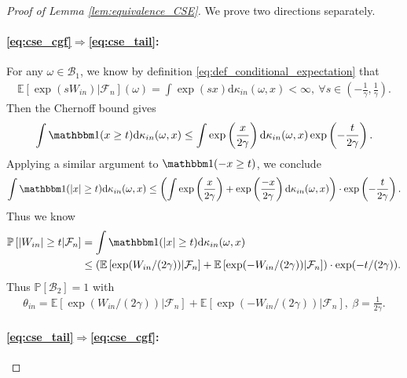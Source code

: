 \documentclass[12pt]{article}
\theoremstyle{definition}
\def\P{\mathbb{P}}
\def\P{\mathbb{P}}
\newcommand{\E}{\mathbb E}								%
\renewcommand{\P}{\mathbb{P}}							%
\newcommand{\indicator}{\mathbbm 1}						%
\begin{document}
\begin{proof}[Proof of Lemma \ref{lem:equivalence_CSE}]
	We prove two directions separately. 
	\paragraph{\eqref{eq:cse_cgf}$\Rightarrow $\eqref{eq:cse_tail}:}
	For any $\omega\in \mathcal{B}_1$, we know by definition \eqref{eq:def_conditional_expectation} that
	\begin{align*}
		\E[\exp(sW_{in})|\mathcal{F}_n](\omega)=\int \exp(sx)\mathrm{d}\kappa_{in}(\omega,x)<\infty,\ \forall s\in \left(-\frac{1}{\gamma},\frac{1}{\gamma}\right).
	\end{align*}
	Then the Chernoff bound gives 
	\begin{align*}
		\int \indicator(x\geq t)\mathrm{d}\kappa_{in}(\omega,x)\leq \int \exp\left(\frac{x}{2\gamma}\right)\mathrm{d}\kappa_{in}(\omega,x)\exp\left(-\frac{t}{2\gamma}\right).
	\end{align*}
	Applying a similar argument to $\indicator(-x\geq t)$, we conclude 
	\begin{align*}
		\int \indicator(|x|\geq t)\mathrm{d}\kappa_{in}(\omega,x)\leq \left(\int \exp\left(\frac{x}{2\gamma}\right)+\exp\left(\frac{-x}{2\gamma}\right)\mathrm{d}\kappa_{in}(\omega,x)\right)\cdot \exp\left(-\frac{t}{2\gamma}\right).
	\end{align*}
	Thus we know 
	\begin{align*}
		\P\left[|W_{in}|\geq t|\mathcal{F}_n\right]
		&
		=\int\indicator(|x|\geq t)\mathrm{d}\kappa_{in}(\omega,x)\\
		&
		\leq \left(\E\left[\exp(W_{in}/(2\gamma))|\mathcal{F}_n\right]+\E\left[\exp(-W_{in}/(2\gamma))|\mathcal{F}_n\right]\right)\cdot \exp(-t/(2\gamma)).
	\end{align*}
	Thus $\P[\mathcal{B}_2]=1$ with
	\begin{align*}
		\theta_{in}=\E\left[\exp(W_{in}/(2\gamma))|\mathcal{F}_n\right]+\E\left[\exp(-W_{in}/(2\gamma))|\mathcal{F}_n\right],\ \beta=\frac{1}{2\gamma}.
	\end{align*}

	\paragraph{\eqref{eq:cse_tail}$\Rightarrow$\eqref{eq:cse_cgf}:}


\end{proof}
\end{document}
